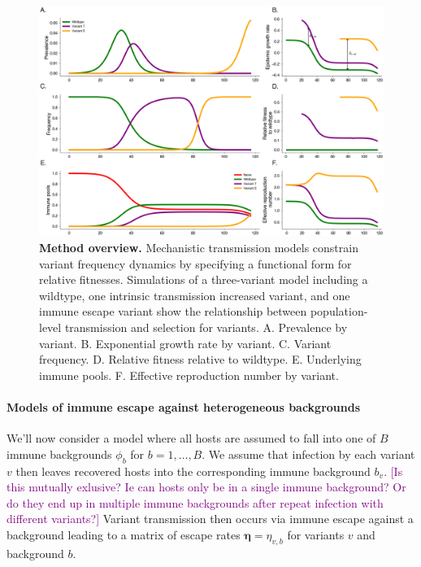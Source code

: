 \documentclass[12pt,oneside,letterpaper]{article}
\renewcommand{\vec}[1]{\boldsymbol{#1}}
\def\tbc#1{\textcolor{purple}{[#1]}}
\begin{document}
\begin{figure}[h]
    \centering
    \includegraphics[width=1.0\linewidth]{./figures/vis_mechanisms.png}
    \caption{\textbf{Method overview.}
    Mechanistic transmission models constrain variant frequency dynamics by specifying a functional form for relative fitnesses.
    Simulations of a three-variant model including a wildtype, one intrinsic transmission increased variant, and one immune escape variant show the relationship between population-level transmission and selection for variants.
    A. Prevalence by variant.
    B. Exponential growth rate by variant.
    C. Variant frequency.
    D. Relative fitness relative to wildtype.
    E. Underlying immune pools.
    F. Effective reproduction number by variant.
}%
    \label{fig:vis_mechanisms}
\end{figure}

\paragraph{Models of immune escape against heterogeneous backgrounds}%

We'll now consider a model where all hosts are assumed to fall into one of $B$ immune backgrounds $\phi_{b}$ for $b =1, \ldots, B$.
We assume that infection by each variant $v$ then leaves recovered hosts into the corresponding immune background $b_{v}$.
\tbc{Is this mutually exlusive? Ie can hosts only be in a single immune background? Or do they end up in multiple immune backgrounds after repeat infection with different variants?}
Variant transmission then occurs via immune escape against a background leading to a matrix of escape rates $\vec{\eta} = \eta_{v,b}$ for variants $v$ and background $b$.
\end{document}
